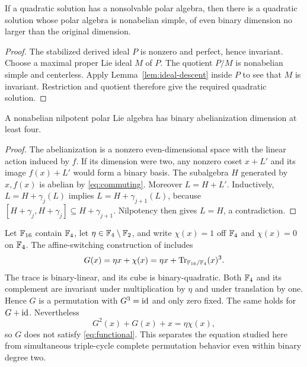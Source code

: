 \begin{corollary}\label{cor:simple-reduction}
If a quadratic solution has a nonsolvable polar algebra, then there is a
quadratic solution whose polar algebra is nonabelian simple, of even
binary dimension no larger than the original dimension.
\end{corollary}
\begin{proof}
The stabilized derived ideal \(P\) is nonzero and perfect, hence invariant.
Choose a maximal proper Lie ideal \(M\) of \(P\). The quotient \(P/M\)
is nonabelian simple and centerless. Apply Lemma~\ref{lem:ideal-descent}
inside \(P\) to see that \(M\) is invariant. Restriction and quotient
therefore give the required quadratic solution.
\end{proof}

\begin{lemma}\label{lem:two-generators}
A nonabelian nilpotent polar Lie algebra has binary abelianization
dimension at least four.
\end{lemma}
\begin{proof}
The abelianization is a nonzero even-dimensional space with the linear
action induced by \(f\). If its dimension were two, any nonzero coset
\(x+L'\) and its image \(f(x)+L'\) would form a binary basis.
The subalgebra \(H\) generated by \(x,f(x)\) is abelian by
\eqref{eq:commuting}. Moreover \(L=H+L'\).
Inductively, \(L=H+\gamma_j(L)\) implies
\(L=H+\gamma_{j+1}(L)\), because
\([H+\gamma_j,H+\gamma_j]\subseteq H+\gamma_{j+1}\).
Nilpotency then gives \(L=H\), a contradiction.
\end{proof}

\begin{example}\label{ex:regular-cpp}
Let \(\mathbb F_{16}\) contain \(\mathbb F_4\), let \(\eta\in\mathbb F_4\setminus\mathbb F_2\),
and write \(\chi(x)=1\) off \(\mathbb F_4\) and \(\chi(x)=0\) on \(\mathbb F_4\).
The affine-switching construction of
\cite[Corollary~6]{Xu2022} includes
\[
 G(x)=\eta x+\chi(x)
      =\eta x+\operatorname{Tr}_{\mathbb F_{16}/\mathbb F_4}(x)^3.
\]
The trace is binary-linear, and its cube is binary-quadratic.
Both \(\mathbb F_4\) and its complement are invariant under multiplication
by \(\eta\) and under translation by one. Hence \(G\) is a permutation
with \(G^3=\operatorname{id}\) and only zero fixed. The same holds for \(G+\operatorname{id}\).
Nevertheless
\[
 G^2(x)+G(x)+x=\eta\chi(x),
\]
so \(G\) does not satisfy \eqref{eq:functional}.
This separates the equation studied here from simultaneous triple-cycle
complete permutation behavior even within binary degree two.
\end{example}
